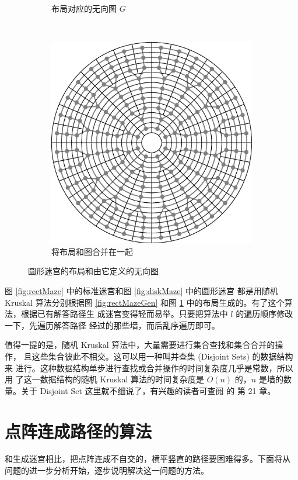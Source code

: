 \documentclass[cs4size,a4paper,adobefonts]{ctexart}
\begin{document}
\begin{figure}[htbp]
\begin{subfigure}[c]{0.31\textwidth}
    \caption{布局对应的无向图 $G$}
  \end{subfigure}
  ~
  \begin{subfigure}[c]{0.31\textwidth}
    \centering
    \includegraphics[width=\textwidth]{diskMerged}
    \caption{将布局和图合并在一起}
  \end{subfigure}
  \caption{圆形迷宫的布局和由它定义的无向图}\label{fig:diskMazeGen}
\end{figure}

图 \ref{fig:rectMaze} 中的标准迷宫和图 \ref{fig:diskMaze} 中的圆形迷宫
都是用随机 Kruskal 算法分别根据图 \ref{fig:rectMazeGen} 和图
\ref{fig:diskMazeGen} 中的布局生成的。有了这个算法，根据已有解答路径生
成迷宫变得轻而易举。只要把算法中 $l$ 的遍历顺序修改一下，先遍历解答路径
经过的那些墙，而后乱序遍历即可。

值得一提的是，随机 Kruskal 算法中，大量需要进行集合查找和集合合并的操作，
且这些集合彼此不相交。这可以用一种叫并查集 (Disjoint Sets) 的数据结构来
进行。这种数据结构单步进行查找或合并操作的时间复杂度几乎是常数，所以用
了这一数据结构的随机 Kruskal 算法的时间复杂度是 $O(n)$ 的，$n$ 是墙的数
量。关于 Disjoint Set 这里就不细说了，有兴趣的读者可查阅 \cite{clrs} 的
第 21 章。

\section{点阵连成路径的算法}
和生成迷宫相比，把点阵连成不自交的，横平竖直的路径要困难得多。下面将从
问题的进一步分析开始，逐步说明解决这一问题的方法。
\end{document}
